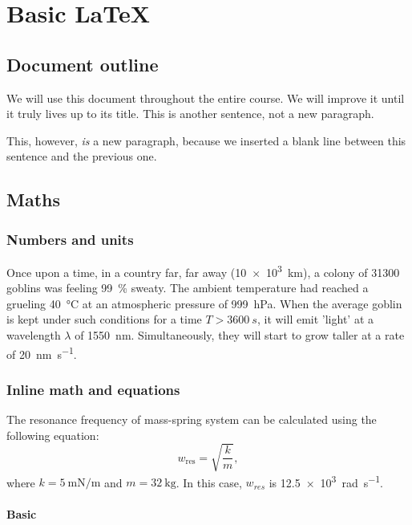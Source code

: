 \chapter{Basic \LaTeX}
\section{Document outline}
We will use this document throughout the entire course. We will improve it until it truly lives up to its title. This is another sentence, not a new paragraph.

This, however, \emph{is} a new paragraph, because we inserted a blank line between this sentence and the previous one.

\section{Maths}
\label{section2}
\subsection{Numbers and units}

Once upon a time, in a country far, far away (\SI{10e3}{km}), a colony of \num{31300} goblins was feeling \SI{99}{\percent} sweaty. The ambient temperature had reached a grueling \SI{40}{\celsius} at an atmospheric pressure of \SI{999}{\hecto\pascal}. When the average goblin is kept under such conditions for a time $T>\SI{3600}{s}$, it will emit 'light' at a wavelength $\lambda$ of \SI{1550}{nm}. Simultaneously, they will start to grow taller at a rate of \SI{20}{\nano\meter\per\second}.

\subsection{Inline math and equations}

The resonance frequency of mass-spring system can be calculated using the following equation:
\begin{equation}
    \label{eq:equation1}
    w_{\mathrm{res}}=\sqrt{\frac{k}{m}},
\end{equation}
where $k=\SI{5}{\milli\newton\per\meter}$ and $m=\SI{32}{\kilogram}$. In this case, $w_{res}$ is \SI{12.5e3}{\radian\per\second}.

\subsubsection{Basic}

